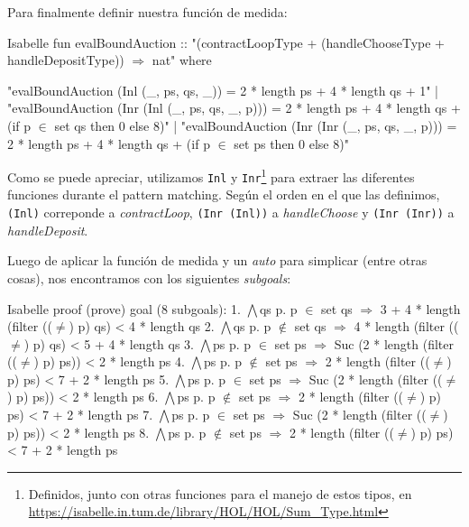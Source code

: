 \documentclass[12pt]{book}
\begin{document}
Para finalmente definir nuestra función de medida:

\newpage
\begin{code}[title=Función que será utilizada por \textit{measure} para probar la terminación del contrato \textit{Auction}., label=lst:evalBoundAuction]{Isabelle}
fun evalBoundAuction :: "(contractLoopType + (handleChooseType + handleDepositType)) $\Rightarrow$ nat" where

"evalBoundAuction (Inl (_, ps, qs, _)) =
        2 * length ps + 4 * length qs + 1" |
"evalBoundAuction (Inr (Inl (_, ps, qs, _, p))) =
        2 * length ps + 4 * length qs + (if p $\in$ set qs then 0 else 8)" |
"evalBoundAuction (Inr (Inr (_, ps, qs, _, p))) =
        2 * length ps + 4 * length qs + (if p $\in$ set ps then 0 else 8)"
\end{code}

Como se puede apreciar, utilizamos \texttt{Inl} y \texttt{Inr}\footnote{Definidos, junto con otras funciones para el manejo de estos tipos, en \url{https://isabelle.in.tum.de/library/HOL/HOL/Sum_Type.html}} para extraer las diferentes funciones durante el pattern matching. Según el orden en el que las definimos, \texttt{(Inl)} correponde a \textit{contractLoop}, \texttt{(Inr (Inl))} a \textit{handleChoose} y \texttt{(Inr (Inr))} a \textit{handleDeposit}.

Luego de aplicar la función de medida y un \textit{auto} para simplicar (entre otras cosas), nos encontramos con los siguientes \textit{subgoals}:

\newpage
\begin{code}[title=Subgoals parciales en la prueba de terminación de \textit{contractLoop} y sus funciones auxiliares.]{Isabelle}
proof (prove)
goal (8 subgoals):
 1. $\bigwedge$qs p.
       p $\in$ set qs $\Rightarrow$
       3 +
       4 *
       length (filter (($\neq$) p) qs)
       < 4 * length qs
 2. $\bigwedge$qs p.
       p $\notin$ set qs $\Rightarrow$
       4 *
       length (filter (($\neq$) p) qs)
       < 5 + 4 * length qs
 3. $\bigwedge$ps p.
       p $\in$ set ps $\Rightarrow$
       Suc (2 *
            length
             (filter (($\neq$) p) ps))
       < 2 * length ps
 4. $\bigwedge$ps p.
       p $\notin$ set ps $\Rightarrow$
       2 *
       length (filter (($\neq$) p) ps)
       < 7 + 2 * length ps
 5. $\bigwedge$ps p.
       p $\in$ set ps $\Rightarrow$
       Suc (2 *
            length
             (filter (($\neq$) p) ps))
       < 2 * length ps
 6. $\bigwedge$ps p.
       p $\notin$ set ps $\Rightarrow$
       2 *
       length (filter (($\neq$) p) ps)
       < 7 + 2 * length ps
 7. $\bigwedge$ps p.
       p $\in$ set ps $\Rightarrow$
       Suc (2 *
            length
             (filter (($\neq$) p) ps))
       < 2 * length ps
 8. $\bigwedge$ps p.
       p $\notin$ set ps $\Rightarrow$
       2 *
       length (filter (($\neq$) p) ps)
       < 7 + 2 * length ps
\end{code}
\end{document}
